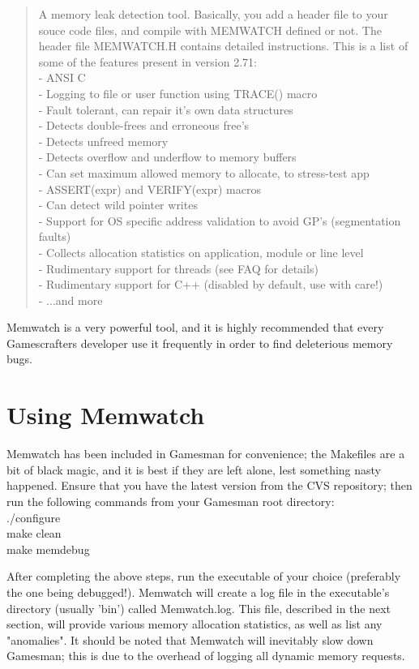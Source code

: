 \documentclass[11pt]{article}
\begin{document}
\begin{quotation}
A memory leak detection tool. Basically, you add a header file to your souce code files, and compile with MEMWATCH defined or not. The header file MEMWATCH.H contains detailed instructions. This is a list of some of the features present in version 2.71:
\\- ANSI C
\\- Logging to file or user function using TRACE() macro
\\- Fault tolerant, can repair it's own data structures
\\- Detects double-frees and erroneous free's
\\- Detects unfreed memory
\\- Detects overflow and underflow to memory buffers
\\- Can set maximum allowed memory to allocate, to stress-test app
\\- ASSERT(expr) and VERIFY(expr) macros
\\- Can detect wild pointer writes
\\- Support for OS specific address validation to avoid GP's (segmentation faults)
\\- Collects allocation statistics on application, module or line level
\\- Rudimentary support for threads (see FAQ for details)
\\- Rudimentary support for C++ (disabled by default, use with care!)
\\- ...and more
\end{quotation}

Memwatch is a very powerful tool, and it is highly recommended that every Gamescrafters developer use it frequently in order to find deleterious memory bugs.

\section{Using Memwatch}
Memwatch has been included in Gamesman for convenience; the Makefiles are a bit of black magic, and it is best if they are left alone, lest something nasty happened. Ensure that you have the latest version from the CVS repository; then run the following commands from your Gamesman root directory:
\\./configure
\\make clean
\\make memdebug

After completing the above steps, run the executable of your choice (preferably the one being debugged!). Memwatch will create a log file in the executable's directory (usually 'bin') called Memwatch.log. This file, described in the next section, will provide various memory allocation statistics, as well as list any "anomalies". It should be noted that Memwatch will inevitably slow down Gamesman; this is due to the overhead of logging all dynamic memory requests.
\end{document}
